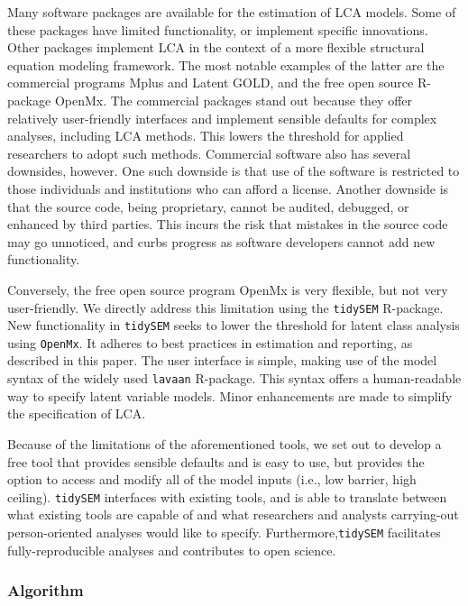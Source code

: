 \documentclass[
  ,man,floatsintext]{apa6}
\begin{document}
Many software packages are available for the estimation of LCA models.
Some of these packages have limited functionality,
or implement specific innovations.
Other packages implement LCA in the context of
a more flexible structural equation modeling framework.
The most notable examples of the latter are
the commercial programs Mplus and Latent GOLD,
and the free open source R-package OpenMx.
The commercial packages stand out
because they offer relatively user-friendly interfaces
and implement sensible defaults for complex analyses,
including LCA methods.
This lowers the threshold for applied researchers to adopt such methods.
Commercial software also has several downsides, however.
One such downside is that use of the software
is restricted to those individuals
and institutions who can afford a license.
Another downside is that the source code,
being proprietary, cannot be audited, debugged,
or enhanced by third parties.
This incurs the risk that mistakes in the source code
may go unnoticed, and curbs progress as
software developers cannot add new functionality.

Conversely, the free open source program OpenMx is very flexible,
but not very user-friendly.
We directly address this limitation using the \texttt{tidySEM} R-package.
New functionality in \texttt{tidySEM} seeks to lower the threshold
for latent class analysis using \texttt{OpenMx}.
It adheres to best practices in estimation and reporting,
as described in this paper.
The user interface is simple,
making use of the model syntax of the widely used \texttt{lavaan} R-package.
This syntax offers a human-readable way to specify latent variable models.
Minor enhancements are made to simplify the specification of LCA.

Because of the limitations of the aforementioned tools,
we set out to develop a free tool that
provides sensible defaults and is easy to use,
but provides the option to access and modify
all of the model inputs (i.e., low barrier, high ceiling).
\texttt{tidySEM} interfaces with existing tools,
and is able to translate between what existing tools are capable of
and what researchers and analysts
carrying-out person-oriented analyses would like to specify.
Furthermore,\texttt{tidySEM} facilitates fully-reproducible analyses
and contributes to open science.

\hypertarget{algorithm}{%
\subsubsection{Algorithm}\label{algorithm}}
\end{document}
